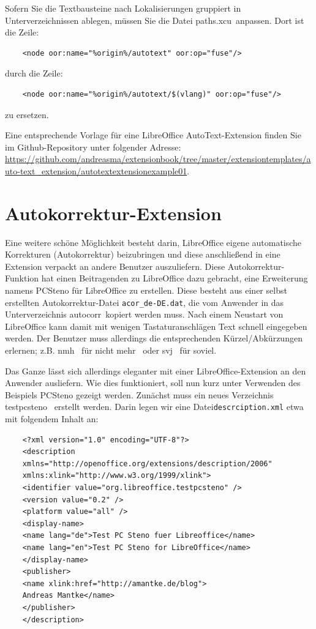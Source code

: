 \documentclass[12pt,a4paper,titlepage]{book}
\begin{document}
Sofern Sie die Textbausteine nach Lokalisierungen gruppiert in Unterverzeichnissen ablegen, müssen Sie die Datei \glqq paths.xcu\grqq~anpassen. Dort ist die Zeile:
\begin{lstlisting}
	<node oor:name="%origin%/autotext" oor:op="fuse"/>
\end{lstlisting}

durch die Zeile:
\begin{lstlisting}
	<node oor:name="%origin%/autotext/$(vlang)" oor:op="fuse"/>
\end{lstlisting}

zu ersetzen.

Eine entsprechende Vorlage für eine LibreOffice AutoText-Extension finden Sie im Github-Repository unter folgender Adresse:\linebreak
\url{https://github.com/andreasma/extensionbook/tree/master/extensiontemplates/auto-text_extension/autotextextensionexample01}.

\section{Autokorrektur-Extension}

Eine weitere schöne Möglichkeit besteht darin, LibreOffice eigene automatische Korrekturen (Autokorrektur) beizubringen und diese anschließend in eine Extension verpackt an andere Benutzer auszuliefern. Diese Autokorrektur-Funktion hat einen Beitragenden zu LibreOffice dazu gebracht, eine Erweiterung namens PCSteno für LibreOffice zu erstellen. Diese besteht aus einer selbst erstellten Autokorrektur-Datei \verb|acor_de-DE.dat|, die vom Anwender in das Unterverzeichnis \glqq autocorr\grqq~kopiert werden muss. Nach einem Neustart von LibreOffice kann damit mit wenigen Tastaturanschlägen Text schnell eingegeben werden. Der Benutzer muss allerdings die entsprechenden Kürzel/Abkürzungen erlernen; z.B. \glqq nmh\grqq~ für \glqq nicht mehr\grqq~ oder \glqq svj\grqq~ für \glqq soviel\grqq.

Das Ganze lässt sich allerdings eleganter mit einer LibreOffice-Extension an den Anwender ausliefern. Wie dies funktioniert, soll nun kurz unter Verwenden des Beispiels PCSteno gezeigt werden. Zunächst muss ein neues Verzeichnis \glqq testpcsteno\grqq~ erstellt werden. Darin legen wir eine Datei\linebreak \verb|descrciption.xml| etwa mit folgendem Inhalt an:

\begin{lstlisting}
	<?xml version="1.0" encoding="UTF-8"?>
	<description
	xmlns="http://openoffice.org/extensions/description/2006"
	xmlns:xlink="http://www.w3.org/1999/xlink">
	<identifier value="org.libreoffice.testpcsteno" />
	<version value="0.2" />
	<platform value="all" />
	<display-name>
	<name lang="de">Test PC Steno fuer Libreoffice</name>
	<name lang="en">Test PC Steno for LibreOffice</name>
	</display-name>
	<publisher>
	<name xlink:href="http://amantke.de/blog">
	Andreas Mantke</name>
	</publisher>
	</description>
\end{lstlisting}
\end{document}
